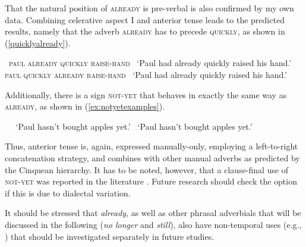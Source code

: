\noindent That the natural position of \textsc{already} is pre-verbal is also confirmed by my own data. Combining celerative aspect I and anterior tense leads to the predicted results, namely that the adverb \textsc{already} has to precede \textsc{quickly}, as shown in (\ref{quicklyalready}).

\begin{exe}
\ex\label{quicklyalready}\begin{xlist} 
\ex \textcolor{white}{*}\textsc{paul already quickly raise-hand} \label{quicklyalreadya}
\glt \textcolor{white}{*}`Paul had already quickly raised his hand.'
\ex *\textsc{paul quickly already raise-hand}
\glt \textcolor{white}{*}`Paul had already quickly raised his hand.'\label{quicklyalreadyb}
\end{xlist}
\end{exe} 

\noindent Additionally, there is a sign \textsc{not-yet} that behaves in exactly the same way as \textsc{already}, as shown in (\ref{ex:notyetexamples}).

\begin{exe}
\ex\label{ex:notyetexamples}\begin{xlist} 
\ex \textcolor{white}{*}  
\glt \textcolor{white}{*}`Paul hasn't bought apples yet.' \label{ex:notyetexamplesa}
\ex *  
\glt \textcolor{white}{*}`Paul hasn't bought apples yet.' \label{ex:notyetexamplesb}

\end{xlist}
\end{exe}

\noindent Thus, anterior tense is, again, expressed manually-only, employing a left-to-right concatenation strategy, and combines with other manual adverbs as predicted by the Cinquean hierarchy. It has to be noted, however, that a clause-final use of \textsc{not-yet} was reported in the literature \citep[185]{papaspyrou2008grammatik}. Future research should check the option if this is due to dialectal variation.

It should be stressed that \textit{already}, as well as other phrasal adverbials that will be discussed in the following (\textit{no longer} and \textit{still}), also have non-temporal uses (e.g., \citealt{konig1977temporal, lobner1989germanschon, van1998phasal}) that should be investigated separately in future studies.

